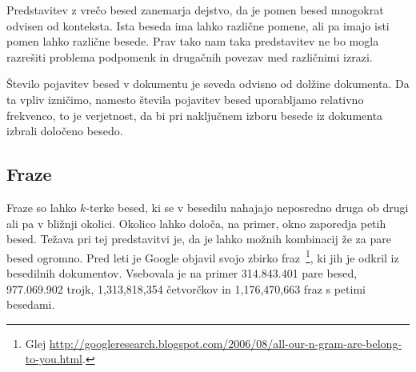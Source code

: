 Predstavitev z vrečo besed zanemarja dejstvo, da je pomen besed
mnogokrat odvisen od konteksta. Ista beseda ima lahko različne pomene,
ali pa imajo isti pomen lahko različne besede. Prav tako nam taka
predstavitev ne bo mogla razrešiti problema podpomenk in drugačnih
povezav med različnimi izrazi.

Število pojavitev besed v dokumentu je seveda odvisno od dolžine
dokumenta. Da ta vpliv izničimo, namesto števila pojavitev besed
uporabljamo relativno frekvenco, to je verjetnost, da bi pri
naključnem izboru besede iz dokumenta izbrali določeno besedo.

\subsection{Fraze}

Fraze so lahko $k$-terke besed, ki se v besedilu nahajajo neposredno
druga ob drugi ali pa v bližnji okolici. Okolico lahko določa, na
primer, okno zaporedja petih besed. Težava pri tej predstavitvi je, da
je lahko možnih kombinacij že za pare besed ogromno. Pred leti je
Google objavil svojo zbirko fraz~\footnote{Glej
  \url{http://googleresearch.blogspot.com/2006/08/all-our-n-gram-are-belong-to-you.html}.},
ki jih je odkril iz besedilnih dokumentov. Vsebovala je na primer
314.843.401 pare besed, 977.069.902 trojk, 1,313,818,354 četvorčkov in
1,176,470,663 fraz s petimi besedami.

